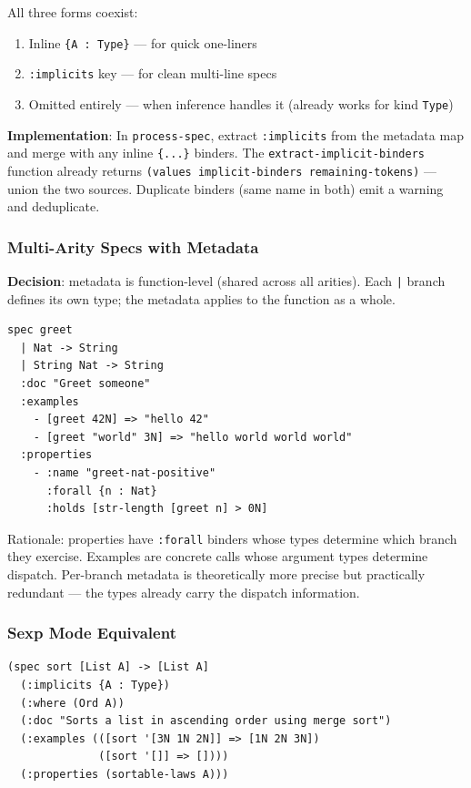 \documentclass[11pt]{article}
\begin{document}
All three forms coexist:
\begin{enumerate}
\item Inline \texttt{\{A : Type\}} --- for quick one-liners
\item \texttt{:implicits} key --- for clean multi-line specs
\item Omitted entirely --- when inference handles it (already works for kind \texttt{Type})
\end{enumerate}

\textbf{Implementation}: In \texttt{process-spec}, extract \texttt{:implicits} from the metadata map
and merge with any inline \texttt{\{...\}} binders. The \texttt{extract-implicit-binders}
function already returns \texttt{(values implicit-binders remaining-tokens)} --- union
the two sources. Duplicate binders (same name in both) emit a warning and
deduplicate.
\subsubsection{Multi-Arity Specs with Metadata}
\label{sec:orgbdade3f}

\textbf{Decision}: metadata is function-level (shared across all arities). Each \texttt{|}
branch defines its own type; the metadata applies to the function as a whole.

\begin{verbatim}
spec greet
  | Nat -> String
  | String Nat -> String
  :doc "Greet someone"
  :examples
    - [greet 42N] => "hello 42"
    - [greet "world" 3N] => "hello world world world"
  :properties
    - :name "greet-nat-positive"
      :forall {n : Nat}
      :holds [str-length [greet n] > 0N]
\end{verbatim}

Rationale: properties have \texttt{:forall} binders whose types determine which
branch they exercise. Examples are concrete calls whose argument types
determine dispatch. Per-branch metadata is theoretically more precise but
practically redundant --- the types already carry the dispatch information.
\subsubsection{Sexp Mode Equivalent}
\label{sec:org0e1cc49}

\begin{verbatim}
(spec sort [List A] -> [List A]
  (:implicits {A : Type})
  (:where (Ord A))
  (:doc "Sorts a list in ascending order using merge sort")
  (:examples (([sort '[3N 1N 2N]] => [1N 2N 3N])
              ([sort '[]] => [])))
  (:properties (sortable-laws A)))
\end{verbatim}
\end{document}
